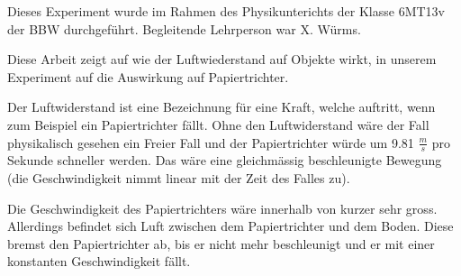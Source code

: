 Dieses Experiment wurde im Rahmen des Physikunterichts der Klasse 6MT13v der BBW durchgeführt. Begleitende Lehrperson war X. Würms.

Diese Arbeit zeigt auf wie der Luftwiederstand auf Objekte wirkt, in unserem Experiment auf die Auswirkung auf Papiertrichter.

Der Luftwiderstand ist eine Bezeichnung für eine Kraft, welche auftritt, wenn zum Beispiel ein Papiertrichter fällt. Ohne den Luftwiderstand wäre der Fall physikalisch gesehen ein Freier Fall und der Papiertrichter würde um 9.81 \(\frac{m}{s}\) pro Sekunde schneller werden. Das wäre eine gleichmässig beschleunigte Bewegung (die Geschwindigkeit nimmt linear mit der Zeit des Falles zu). 

Die Geschwindigkeit des Papiertrichters wäre innerhalb von kurzer sehr gross. Allerdings befindet sich Luft zwischen dem Papiertrichter und dem Boden. Diese bremst den Papiertrichter ab, bis er nicht mehr beschleunigt und er mit einer konstanten Geschwindigkeit fällt.
